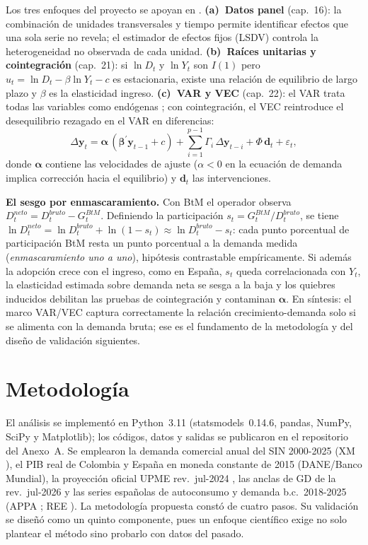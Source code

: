 \documentclass[11pt,letterpaper]{article}
\begin{document}
Los tres enfoques del proyecto se apoyan en \cite{gujarati}.
\textbf{(a)~Datos panel} (cap.~16): la combinación de unidades transversales
y tiempo permite identificar efectos que una sola serie no revela; el
estimador de efectos fijos (LSDV) controla la heterogeneidad no observada de
cada unidad. \textbf{(b)~Raíces unitarias y cointegración} (cap.~21): si
$\ln D_t$ y $\ln Y_t$ son $I(1)$ pero $u_t=\ln D_t-\beta\ln Y_t-c$ es
estacionaria, existe una relación de equilibrio de largo plazo
\cite{engle1987,johansen1988} y $\beta$ es la elasticidad ingreso.
\textbf{(c)~VAR y VEC} (cap.~22): el VAR trata todas las variables como
endógenas \cite{sims1980}; con cointegración, el VEC reintroduce el
desequilibrio rezagado en el VAR en diferencias:
\begin{equation}
\Delta \mathbf{y}_t = \boldsymbol{\alpha}\,
(\boldsymbol{\beta}^{\prime}\mathbf{y}_{t-1}+c)+
\sum_{i=1}^{p-1}\Gamma_i\,\Delta\mathbf{y}_{t-i}+
\Phi\,\mathbf{d}_t+\varepsilon_t ,
\label{eq:vecm}
\end{equation}
donde $\boldsymbol{\alpha}$ contiene las velocidades de ajuste
($\alpha<0$ en la ecuación de demanda implica corrección hacia el
equilibrio) y $\mathbf{d}_t$ las intervenciones.

\textbf{El sesgo por enmascaramiento.} Con BtM el operador observa
$D^{neto}_t=D^{bruto}_t-G^{BtM}_t$. Definiendo la participación
$s_t=G^{BtM}_t/D^{bruto}_t$, se tiene
$\ln D^{neto}_t=\ln D^{bruto}_t+\ln(1-s_t)\approx\ln D^{bruto}_t-s_t$: cada
punto porcentual de participación BtM resta un punto porcentual a la demanda
medida (\emph{enmascaramiento uno a uno}), hipótesis contrastable
empíricamente. Si además la adopción crece con el ingreso, como en
España, $s_t$ queda correlacionada con $Y_t$, la elasticidad estimada
sobre demanda neta se sesga a la baja y los quiebres inducidos debilitan las
pruebas de cointegración y contaminan $\boldsymbol{\alpha}$. En síntesis: el
marco VAR/VEC captura correctamente la relación crecimiento-demanda solo si
se alimenta con la demanda bruta; ese es el fundamento de la metodología y
del diseño de validación siguientes.

\section{Metodología}
\label{sec:metodo}

El análisis se implementó en Python~3.11 (statsmodels~0.14.6, pandas,
NumPy, SciPy y Matplotlib); los códigos, datos y salidas se publicaron en el
repositorio del Anexo~A. Se emplearon la demanda comercial anual del SIN
2000-2025 (XM \cite{xm2025,xm2026}), el PIB real de Colombia y España en
moneda constante de 2015 (DANE/Banco Mundial), la proyección oficial UPME
rev.\ jul-2024 \cite{upme2024}, las anclas de GD de la rev.\ jul-2026
\cite{upme2026} y las series españolas de autoconsumo y demanda b.c.\
2018-2025 (APPA \cite{appa2025}; REE \cite{ree2026,reeise}). La metodología
propuesta constó de cuatro pasos. Su validación se diseñó como un quinto
componente, pues un enfoque científico exige no solo plantear el método sino
probarlo con datos del pasado.
\end{document}
